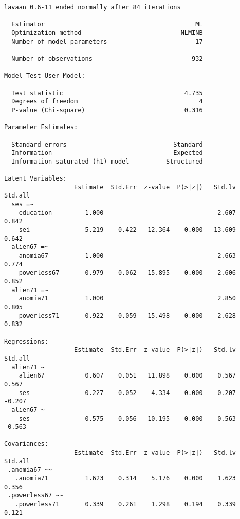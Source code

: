 \begin{verbatim}
lavaan 0.6-11 ended normally after 84 iterations

  Estimator                                         ML
  Optimization method                           NLMINB
  Number of model parameters                        17
                                                      
  Number of observations                           932
                                                      
Model Test User Model:
                                                      
  Test statistic                                 4.735
  Degrees of freedom                                 4
  P-value (Chi-square)                           0.316

Parameter Estimates:

  Standard errors                             Standard
  Information                                 Expected
  Information saturated (h1) model          Structured

Latent Variables:
                   Estimate  Std.Err  z-value  P(>|z|)   Std.lv  Std.all
  ses =~                                                                
    education         1.000                               2.607    0.842
    sei               5.219    0.422   12.364    0.000   13.609    0.642
  alien67 =~                                                            
    anomia67          1.000                               2.663    0.774
    powerless67       0.979    0.062   15.895    0.000    2.606    0.852
  alien71 =~                                                            
    anomia71          1.000                               2.850    0.805
    powerless71       0.922    0.059   15.498    0.000    2.628    0.832

Regressions:
                   Estimate  Std.Err  z-value  P(>|z|)   Std.lv  Std.all
  alien71 ~                                                             
    alien67           0.607    0.051   11.898    0.000    0.567    0.567
    ses              -0.227    0.052   -4.334    0.000   -0.207   -0.207
  alien67 ~                                                             
    ses              -0.575    0.056  -10.195    0.000   -0.563   -0.563

Covariances:
                   Estimate  Std.Err  z-value  P(>|z|)   Std.lv  Std.all
 .anomia67 ~~                                                           
   .anomia71          1.623    0.314    5.176    0.000    1.623    0.356
 .powerless67 ~~                                                        
   .powerless71       0.339    0.261    1.298    0.194    0.339    0.121


\end{verbatim}
